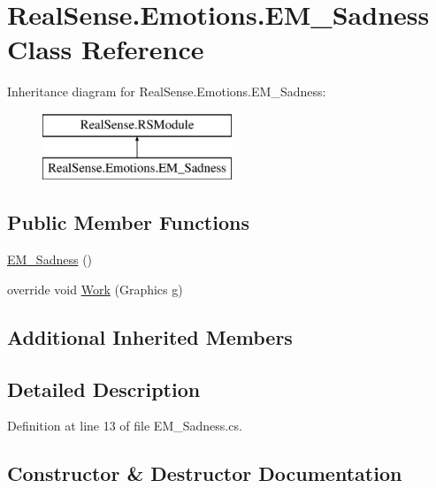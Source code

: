 \hypertarget{class_real_sense_1_1_emotions_1_1_e_m___sadness}{}\section{Real\+Sense.\+Emotions.\+E\+M\+\_\+\+Sadness Class Reference}
\label{class_real_sense_1_1_emotions_1_1_e_m___sadness}
Inheritance diagram for Real\+Sense.\+Emotions.\+E\+M\+\_\+\+Sadness\+:\begin{figure}[H]
\begin{center}
\leavevmode
\includegraphics[height=2.000000cm]{class_real_sense_1_1_emotions_1_1_e_m___sadness}
\end{center}
\end{figure}
\subsection*{Public Member Functions}
\begin{DoxyCompactItemize}
\item 
\hyperlink{class_real_sense_1_1_emotions_1_1_e_m___sadness_ad0a149a2f1b6aefd5fedd870a1cefb00}{E\+M\+\_\+\+Sadness} ()
\item 
override void \hyperlink{class_real_sense_1_1_emotions_1_1_e_m___sadness_a45cf23f5c3382bc9769abf1ef401ade1}{Work} (Graphics g)
\end{DoxyCompactItemize}
\subsection*{Additional Inherited Members}


\subsection{Detailed Description}


Definition at line 13 of file E\+M\+\_\+\+Sadness.\+cs.



\subsection{Constructor \& Destructor Documentation}
\mbox{\label{class_real_sense_1_1_emotions_1_1_e_m___sadness_ad0a149a2f1b6aefd5fedd870a1cefb00}} 
